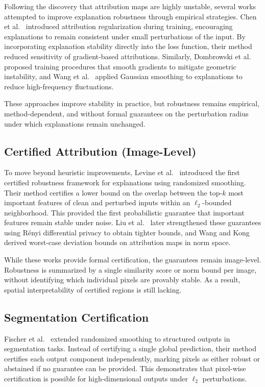 \documentclass[11pt]{article}
\begin{document}
Following the discovery that attribution maps are highly unstable, several works attempted to improve explanation robustness through empirical strategies. Chen et al.~\cite{chen2019robust} introduced attribution regularization during training, encouraging explanations to remain consistent under small perturbations of the input. By incorporating explanation stability directly into the loss function, their method reduced sensitivity of gradient-based attributions. Similarly, Dombrowski et al.~\cite{dombrowski2022towards} proposed training procedures that smooth gradients to mitigate geometric instability, and Wang et al.~\cite{wang2020smoothed} applied Gaussian smoothing to explanations to reduce high-frequency fluctuations.

These approaches improve stability in practice, but robustness remains empirical, method-dependent, and without formal guarantees on the perturbation radius under which explanations remain unchanged.

\subsection{Certified Attribution (Image-Level)}

To move beyond heuristic improvements, Levine et al.~\cite{levine2019certifiably} introduced the first certified robustness framework for explanations using randomized smoothing. Their method certifies a lower bound on the overlap between the top-$k$ most important features of clean and perturbed inputs within an $\ell_2$-bounded neighborhood. This provided the first probabilistic guarantee that important features remain stable under noise. Liu et al.~\cite{liu2022renyi} later strengthened these guarantees using Rényi differential privacy to obtain tighter bounds, and Wang and Kong~\cite{wang2023practical,wang2024certified} derived worst-case deviation bounds on attribution maps in norm space.

While these works provide formal certification, the guarantees remain image-level. Robustness is summarized by a single similarity score or norm bound per image, without identifying which individual pixels are provably stable. As a result, spatial interpretability of certified regions is still lacking.

\subsection{Segmentation Certification}

Fischer et al.~\cite{fischer2021scalable} extended randomized smoothing to structured outputs in segmentation tasks. Instead of certifying a single global prediction, their method certifies each output component independently, marking pixels as either robust or abstained if no guarantee can be provided. This demonstrates that pixel-wise certification is possible for high-dimensional outputs under $\ell_2$ perturbations.
\end{document}

